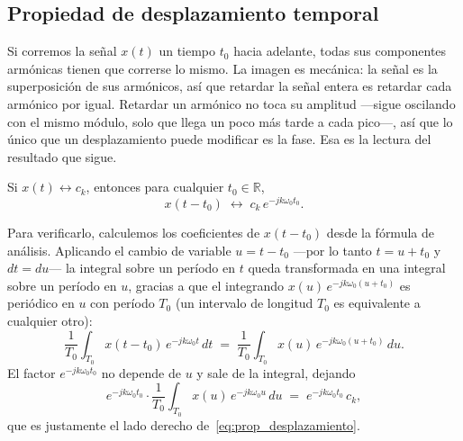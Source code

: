\documentclass[class=book, crop=false]{standalone}
\begin{document}
\subsection{Propiedad de desplazamiento temporal}
\label{subsec:prop_desplazamiento}

Si corremos la señal $x(t)$ un tiempo $t_0$ hacia adelante, todas
sus componentes armónicas tienen que correrse lo mismo. La imagen
es mecánica: la señal es la superposición de sus armónicos, así
que retardar la señal entera es retardar cada armónico por
igual. Retardar un armónico no toca su amplitud ---sigue oscilando
con el mismo módulo, solo que llega un poco más tarde a cada
pico---, así que lo único que un desplazamiento puede modificar es
la fase. Esa es la lectura del resultado que sigue.

\begin{resultado}
Si $x(t)\leftrightarrow c_k$, entonces para cualquier $t_0\in\mathbb{R}$,
\begin{equation}
    x(t - t_0)
    \;\longleftrightarrow\;
    c_k\,e^{-jk\omega_0 t_0}.
    \label{eq:prop_desplazamiento}
\end{equation}
\end{resultado}

Para verificarlo, calculemos los coeficientes de $x(t-t_0)$ desde la
fórmula de análisis. Aplicando el cambio de variable $u = t - t_0$ ---por
lo tanto $t = u + t_0$ y $dt = du$--- la integral sobre un período en $t$
queda transformada en una integral sobre un período en $u$, gracias a
que el integrando $x(u)\,e^{-jk\omega_0(u+t_0)}$ es periódico en $u$ con
período $T_0$ (un intervalo de longitud $T_0$ es equivalente a cualquier
otro):
\begin{equation*}
    \frac{1}{T_0}\int_{T_0} x(t - t_0)\,e^{-jk\omega_0 t}\,dt
    \;=\; \frac{1}{T_0}\int_{T_0} x(u)\,e^{-jk\omega_0(u + t_0)}\,du.
\end{equation*}
El factor $e^{-jk\omega_0 t_0}$ no depende de $u$ y sale de la
integral, dejando
\begin{equation*}
    e^{-jk\omega_0 t_0}\cdot\frac{1}{T_0}\int_{T_0} x(u)\,e^{-jk\omega_0 u}\,du
    \;=\; e^{-jk\omega_0 t_0}\,c_k,
\end{equation*}
que es justamente el lado derecho de~\eqref{eq:prop_desplazamiento}.
\end{document}
